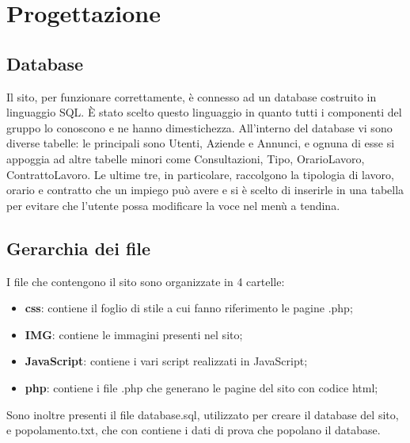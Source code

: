 \section{Progettazione}
	\subsection{Database}
Il sito, per funzionare correttamente, è connesso ad un database costruito in linguaggio SQL. È stato scelto questo linguaggio in quanto tutti i componenti del gruppo lo conoscono e ne hanno dimestichezza. 
All'interno del database vi sono diverse tabelle: le principali sono Utenti, Aziende e Annunci, e ognuna di esse si appoggia ad altre tabelle minori come Consultazioni, Tipo, OrarioLavoro, ContrattoLavoro. Le ultime tre, in particolare, raccolgono la tipologia di lavoro, orario e contratto che un impiego può avere e si è scelto di inserirle in una tabella per evitare che l'utente possa modificare la voce nel menù a tendina.   

\subsection{Gerarchia dei file}
I file che contengono il sito sono organizzate in 4 cartelle: 
\begin{itemize}
	\item \textbf{css}: contiene il foglio di stile a cui fanno riferimento le pagine .php;
	\item \textbf{IMG}: contiene le immagini presenti nel sito;
	\item \textbf{JavaScript}: contiene i vari script realizzati in JavaScript;
	\item \textbf{php}: contiene i file .php che generano le pagine del sito con codice html;
\end{itemize}
Sono inoltre presenti il file database.sql, utilizzato per creare il database del sito, e popolamento.txt, che con contiene i dati di prova che popolano il database.


